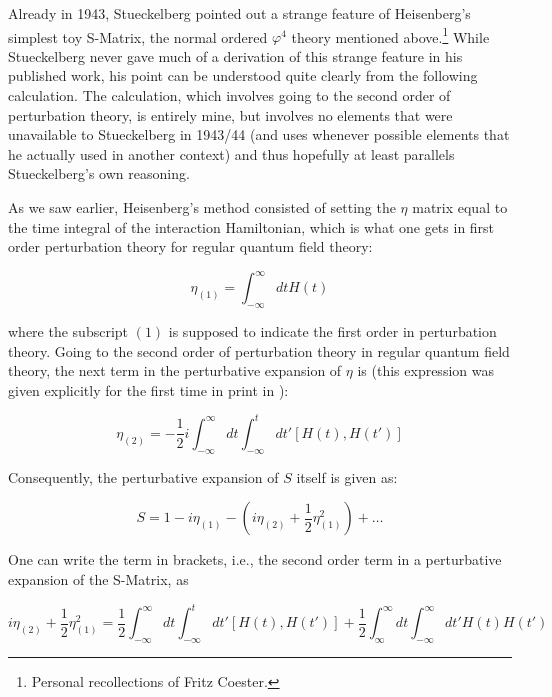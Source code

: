 \documentclass[12pt,a4paper]{article}
\begin{document}
Already in 1943, Stueckelberg pointed out a strange feature of Heisenberg's simplest toy S-Matrix, the normal ordered $\varphi^4$ theory mentioned above.\footnote{Personal recollections of Fritz Coester.} While Stueckelberg never gave much of a derivation of this strange feature in his published work, his point can be understood quite clearly from the following calculation. The calculation, which involves going to the second order of perturbation theory, is entirely mine, but involves no elements that were unavailable to Stueckelberg in 1943/44 (and uses whenever possible elements that he actually used in another context) and thus hopefully at least parallels Stueckelberg's own reasoning.

As we saw earlier, Heisenberg's method consisted of setting the $\eta$ matrix equal to the time integral of the interaction Hamiltonian, which is what one gets in first order perturbation theory for regular quantum field theory: 

\begin{equation}
\label{eq:pert}
\eta_{(1)}  =  \int_{-\infty}^{\infty} dt H(t) 
\end{equation}

where the subscript $(1)$ is supposed to indicate the first order in perturbation theory. Going to the second order of perturbation theory in regular quantum field theory, the next term in the perturbative expansion of $\eta$ is (this expression was given explicitly for the first time in print in \citep[p.20]{stueckelberg_1944_un-modele}):

\begin{equation}
\eta_{(2)}   =  - \frac{1}{2} i \int_{-\infty}^{\infty} dt \int_{-\infty}^{t} dt' \left[H(t), H(t') \right]
\end{equation}

Consequently, the perturbative expansion of $S$ itself is given as:

\begin{equation}
S = 1 - i  \eta_{(1)} -  \left(i \eta_{(2)} + \frac{1}{2} \eta_{(1)}^2 \right) + \ldots 
\end{equation}

One can write the term in brackets, i.e., the second order term in a perturbative expansion of the S-Matrix, as

\begin{equation}
\label{eq:stueck}
i \eta_{(2)} + \frac{1}{2} \eta_{(1)}^2 =  \frac{1}{2} \int_{-\infty}^{\infty} dt \int_{-\infty}^{t} dt' \left[H(t), H(t') \right] + \frac{1}{2} \int_{\infty}^{\infty} dt \int_{-\infty}^{\infty} dt' H(t)  H(t')
\end{equation}
\end{document}
